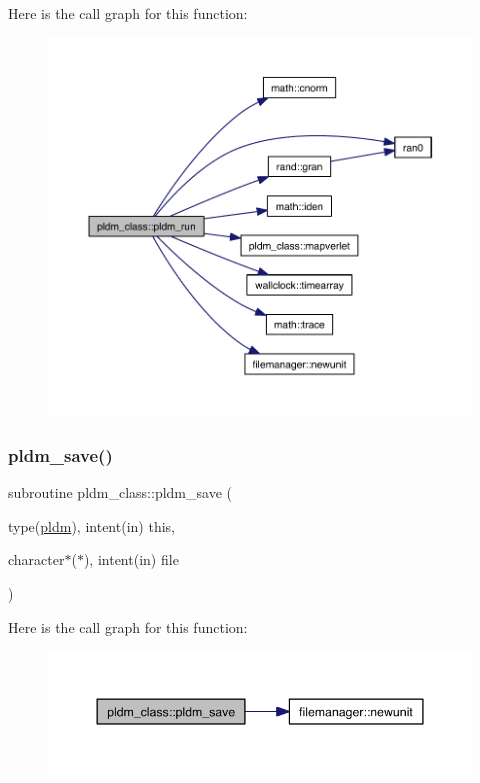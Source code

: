 Here is the call graph for this function\+:\nopagebreak
\begin{figure}[H]
\begin{center}
\leavevmode
\includegraphics[width=350pt]{namespacepldm__class_acb662f59407b2a0bd62fc36aab876482_cgraph}
\end{center}
\end{figure}
\mbox{\label{namespacepldm__class_aa71a81cb75e284923b6a6f8e4085c564}} 
\subsubsection{\texorpdfstring{pldm\+\_\+save()}{pldm\_save()}}
{\footnotesize\ttfamily subroutine pldm\+\_\+class\+::pldm\+\_\+save (\begin{DoxyParamCaption}\item[{type(\hyperlink{structpldm__class_1_1pldm}{pldm}), intent(in)}]{this,  }\item[{character$\ast$($\ast$), intent(in)}]{file }\end{DoxyParamCaption})\hspace{0.3cm}{\ttfamily [private]}}

Here is the call graph for this function\+:\nopagebreak
\begin{figure}[H]
\begin{center}
\leavevmode
\includegraphics[width=344pt]{namespacepldm__class_aa71a81cb75e284923b6a6f8e4085c564_cgraph}
\end{center}
\end{figure}


